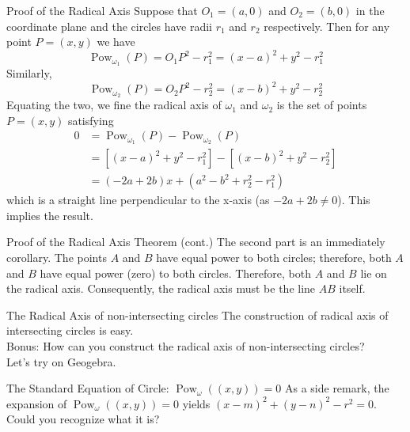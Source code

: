 \documentclass{beamer}
\DeclareMathOperator{\Pow}{Pow}
\begin{document}
\begin{frame}{Proof of the Radical Axis}
	Suppose that $O_1=(a,0)$ and $O_2=(b,0)$ in the coordinate plane and the circles have radii $r_1$ and $r_2$ respectively. Then for any point $P = (x,y)$ we have
	\begin{equation*}
		\Pow_{\omega_1}(P) = O_1P^2-r_1^2=(x-a)^2+y^2-r_1^2
	\end{equation*}
	Similarly,
	\begin{equation*}
		\Pow_{\omega_2}(P) = O_2P^2-r_2^2=(x-b)^2+y^2-r_2^2
	\end{equation*}	
	Equating the two, we fine the radical axis of $\omega_1$ and $\omega_2$ is the set of points $P=(x,y)$ satisfying
	\begin{align*}
		0 &= \Pow_{\omega_1}(P)-\Pow_{\omega_2}(P) \\
		  &= [(x-a)^2+y^2-r_1^2]-[(x-b)^2+y^2-r_2^2] \\
		  &= (-2a+2b)x+(a^2-b^2+r_2^2-r_1^2)
	\end{align*}
	which is a straight line perpendicular to the x-axis (as $-2a+2b\neq 0$). This implies the result.
\end{frame}

\begin{frame}{Proof of the Radical Axis Theorem (cont.)}
	The second part is an immediately corollary. The points $A$ and $B$ have equal power to both circles; therefore, both $A$ and $B$ have equal power (zero) to both circles. Therefore, both $A$ and $B$ lie on the radical axis. Consequently, the radical axis must be the line $AB$ itself.
\end{frame}

\begin{frame}{The Radical Axis of non-intersecting circles}
	The construction of radical axis of intersecting circles is easy. \\
	Bonus: How can you construct the radical axis of non-intersecting circles? \\
	Let's try on Geogebra.
\end{frame}

\begin{frame}{The Standard Equation of Circle: $\Pow_\omega((x,y))=0$}
	As a side remark, the expansion of $\Pow_\omega((x,y)) = 0$ yields  $(x-m)^2+(y-n)^2-r^2=0$. Could you recognize what it is?
\end{frame}
\end{document}

